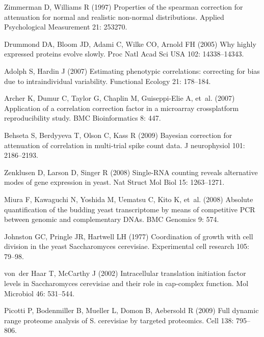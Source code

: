 \documentclass[10pt]{article}
\begin{document}
\begin{thebibliography}{10}
Zimmerman D, Williams R (1997) Properties of the spearman correction for
  attenuation for normal and realistic non-normal distributions.
\newblock Applied Psychological Measurement 21: 253270.

Drummond DA, Bloom JD, Adami C, Wilke CO, Arnold FH (2005) {Why highly
  expressed proteins evolve slowly}.
\newblock Proc Natl Acad Sci USA 102: 14338--14343.

Adolph S, Hardin J (2007) Estimating phenotypic correlations: correcting for
  bias due to intraindividual variability.
\newblock Functional Ecology 21: 178--184.

Archer K, Dumur C, Taylor G, Chaplin M, Guiseppi-Elie A, et~al. (2007)
  Application of a correlation correction factor in a microarray crossplatform
  reproducibility study.
\newblock BMC Bioinformatics 8: 447.

Behseta S, Berdyyeva T, Olson C, Kass R (2009) Bayesian correction for
  attenuation of correlation in multi-trial spike count data.
\newblock J neurophysiol 101: 2186--2193.

Zenklusen D, Larson D, Singer R (2008) Single-{RNA} counting reveals
  alternative modes of gene expression in yeast.
\newblock Nat Struct Mol Biol 15: 1263--1271.

Miura F, Kawaguchi N, Yoshida M, Uematsu C, Kito K, et~al. (2008) Absolute
  quantification of the budding yeast transcriptome by means of competitive
  {PCR} between genomic and complementary {DNAs}.
\newblock BMC Genomics 9: 574.

Johnston GC, Pringle JR, Hartwell LH (1977) {Coordination of growth with cell
  division in the yeast Saccharomyces cerevisiae.}
\newblock Experimental cell research 105: 79--98.

von~der Haar T, McCarthy J (2002) Intracellular translation initiation factor
  levels in {S}accharomyces cerevisiae and their role in cap-complex function.
\newblock Mol Microbiol 46: 531--544.

Picotti P, Bodenmiller B, Mueller L, Domon B, Aebersold R (2009) Full dynamic
  range proteome analysis of {S.} cerevisiae by targeted proteomics.
\newblock Cell 138: 795--806.


\end{thebibliography}
\end{document}
